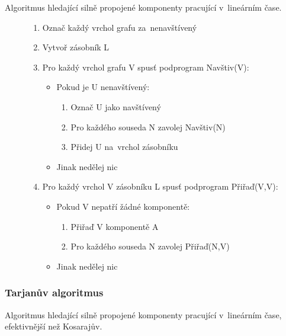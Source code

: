 Algoritmus hledající silně propojené komponenty pracující v~lineárním čase.

\begin{figure}[ht]
\onehalfspacing
\begin{enumerate}
\item Označ každý vrchol grafu za~nenavštívený
\item Vytvoř zásobník L
\item Pro každý vrchol grafu V spusť podprogram Navštiv(V):
    \begin{itemize}
    \item Pokud je U nenavštívený:
        \begin{enumerate}
        \item Označ U jako navštívený
        \item Pro každého souseda N zavolej Navštiv(N)
        \item Přidej U na~vrchol zásobníku
        \end{enumerate}
    \item Jinak nedělej nic
    \end{itemize}
\item Pro každý vrchol V zásobníku L spusť podprogram Přiřaď(V,V):
    \begin{itemize}
    \item Pokud V nepatří žádné komponentě:
        \begin{enumerate}
        \item Přiřaď V komponentě A
        \item Pro každého souseda N zavolej Přiřaď(N,V)
        \end{enumerate}
    \item Jinak nedělej nic
    \end{itemize}
\end{enumerate}
\end{figure}
\FloatBarrier

\subsubsection{Tarjanův algoritmus}

Algoritmus hledající silně propojené komponenty pracující v~lineárním čase, efektivnější než Kosarajův.

